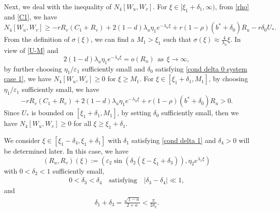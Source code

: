 \documentclass[11pt,a4paper]{article}
\numberwithin{equation}{section}
\numberwithin{figure}{section}
\newcommand{\red}[1]{{\color{red}#1}}
\newcommand\bea{\begin{eqnarray}}
\newcommand\eea{\end{eqnarray}}
\begin{document}
Next, we deal with the inequality of $N_4[W_u, W_v]$.
For $\xi\in[\xi_1+\delta_1,\infty)$, from \eqref{rho} and \eqref{C1}, we have
\begin{equation*}
N_4[W_u,W_v]\geq -rR_v(C_1+R_v)+2(1-d)\lambda_u\eta_1e^{-\lambda_u\xi}+r(1-\rho)(b^*+\delta_0)R_u-r\delta_0U_*.
\end{equation*}
From the definition of $\sigma(\xi)$, we can find a $M_1>\xi_1$ such that $\sigma(\xi)\approx \frac{4}{\lambda_u}\xi$.
In view of \eqref{U-M} and 
$$2(1-d)\lambda_u\eta_1e^{-\lambda_u\xi}=o(R_u)\ \ \text{as} \ \ \xi\to\infty,$$
by further choosing ${\eta_1}/{\varepsilon_1}$ sufficiently small and $\delta_0$ satisfying \eqref{cond delta 0 system case 1}, we have $N_4[W_u,W_v]\geq0$
for $\xi\geq M_1$. For $\xi\in[\xi_1+\delta_1,M_1]$, by choosing ${\eta_1}/{\varepsilon_1}$ sufficiently small, we have
$$-rR_v(C_1+R_v)+2(1-d)\lambda_u\eta_1e^{-\lambda_u\xi}+r(1-\rho)(b^*+\delta_0)R_u> 0.$$
Since $U_*$ is bounded on $[\xi_1+\delta_1,M_1]$, by setting $\delta_0$ sufficiently small, then we have $N_4[W_u,W_v]\geq0$ for all $\xi\geq \xi_1+\delta_1$.




\medskip

 We consider $\xi\in[\xi_1-\delta_4,\xi_1+\delta_1]$ with $\delta_1$ satisfying \eqref{cond delta 1} and $\delta_4>0$ will be determined later. In this case, we have
$$(R_u,R_v)(\xi):=(\varepsilon_2\sin(\delta_2(\xi-\xi_1+\delta_3)),\eta_2e^{\lambda_{1}\xi})$$
with $0<\delta_2<1$ sufficiently small,
\bea\label{cond delta 4}
0<\delta_3<\delta_4\quad\text{satisfying}\quad|\delta_3-\delta_4|\ll 1,
\eea
 and
\bea\label{cond delta 3 4}
\delta_1+\delta_3=\frac{\sqrt{1-a}}{2+a}<\frac{\pi}{2\delta_2}.
\eea
\end{document}
